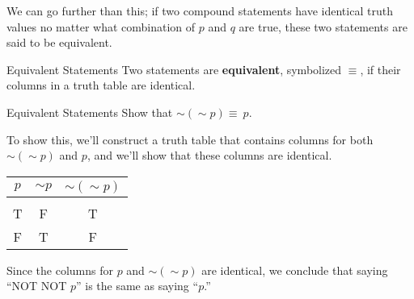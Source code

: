 We can go further than this; if two compound statements have identical truth values no matter what combination of $p$ and $q$ are true, these two statements are said to be equivalent.

\begin{proc}{Equivalent Statements}
Two statements are \textbf{equivalent}, symbolized $\equiv$, if their columns in a truth table are identical.
\end{proc}

\begin{example}[https://www.youtube.com/watch?v=B5GmnkcuKHc]{Equivalent Statements}
Show that $\sim (\sim p) \equiv\ p$.

\sol
To show this, we'll construct a truth table that contains columns for both $\sim(\sim p)$ and $p$, and we'll show that these columns are identical.
\begin{center}
\begin{tabular}{|c c c|}
\hline
$p$ & $\sim p$ & $\sim (\sim p)$\\
\hline
& &\\
T & F & T\\
F & T & F\\
\hline
\end{tabular}
\end{center}

Since the columns for $p$ and $\sim (\sim p)$ are identical, we conclude that saying ``NOT NOT $p$'' is the same as saying ``$p$.''
\end{example}

